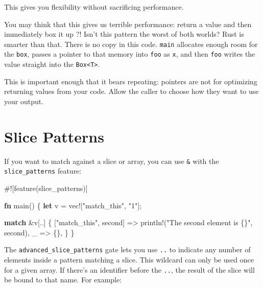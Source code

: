 \documentclass[a4paper,]{book}
\newenvironment{Shaded}{\begin{snugshade}}{\end{snugshade}}
\newcommand{\KeywordTok}[1]{\textcolor[rgb]{0.13,0.29,0.53}{\textbf{{#1}}}}
\newcommand{\StringTok}[1]{\textcolor[rgb]{0.31,0.60,0.02}{{#1}}}
\newcommand{\OtherTok}[1]{\textcolor[rgb]{0.56,0.35,0.01}{{#1}}}
\newcommand{\NormalTok}[1]{{#1}}
\begin{document}
This gives you flexibility without sacrificing performance.

You may think that this gives us terrible performance: return a value
and then immediately box it up ?! Isn't this pattern the worst of both
worlds? Rust is smarter than that. There is no copy in this code.
\texttt{main} allocates enough room for the \texttt{box}, passes a
pointer to that memory into \texttt{foo} as \texttt{x}, and then
\texttt{foo} writes the value straight into the
\texttt{Box\textless{}T\textgreater{}}.

This is important enough that it bears repeating: pointers are not for
optimizing returning values from your code. Allow the caller to choose
how they want to use your output.

\section{Slice Patterns}\label{sec--slice-patterns}

If you want to match against a slice or array, you can use \texttt{\&}
with the \texttt{slice\_patterns} feature:

\begin{Shaded}
\begin{Highlighting}[]
\NormalTok{#![feature(slice_patterns)]}

\KeywordTok{fn} \NormalTok{main() \{}
    \KeywordTok{let} \NormalTok{v = }\OtherTok{vec!}\NormalTok{[}\StringTok{"match_this"}\NormalTok{, }\StringTok{"1"}\NormalTok{];}

    \KeywordTok{match} \NormalTok{&v[..] \{}
        \NormalTok{[}\StringTok{"match_this"}\NormalTok{, second] => }\OtherTok{println!}\NormalTok{(}\StringTok{"The second element is \{\}"}\NormalTok{, second),}
        \NormalTok{_ => \{\},}
    \NormalTok{\}}
\NormalTok{\}}
\end{Highlighting}
\end{Shaded}

The \texttt{advanced\_slice\_patterns} gate lets you use \texttt{..} to
indicate any number of elements inside a pattern matching a slice. This
wildcard can only be used once for a given array. If there's an
identifier before the \texttt{..}, the result of the slice will be bound
to that name. For example:
\end{document}
